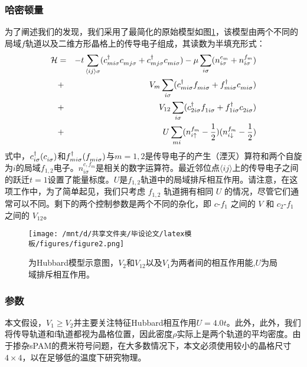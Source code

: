 \subsubsection{哈密顿量}
为了阐述我们的发现，我们采用了最简化的原始模型如图\ref{fig4.1.1}，该模型由两个不同的局域$f$轨道以及二维方形晶格上的传导电子组成，其读数为半填充形式：
\begin{eqnarray}
    {\cal H} &=& - t \sum\limits_{\langle ij \rangle \sigma}
(c^{\dagger}_{mi\sigma}c_{mj\sigma}^{\vphantom{dagger}}
+c^{\dagger}_{mj\sigma}c_{mi\sigma}^{\vphantom{dagger}})
- \mu \sum\limits_{i\sigma} (n^{c_m}_{i\sigma}+ n^{f_m}_{i\sigma} )  \nonumber \\
&+& V_m \sum\limits_{i \sigma}  (c^{\dagger}_{mi\sigma}f_{mi\sigma}^{\vphantom{dagger}}+ f^{\dagger}_{mi\sigma}c_{mi\sigma}^{\vphantom{dagger}}) \nonumber \\
 &+& V_{12} \sum\limits_{i \sigma}  (c^{\dagger}_{2i\sigma}f_{1i\sigma}^{\vphantom{dagger}}+ f^{\dagger}_{1i\sigma}c_{2i\sigma}^{\vphantom{dagger}}) \nonumber \\
    &+& U \sum\limits_{mi} (n^{f_m}_{i\uparrow}-\frac{1}{2}) (n^{f_m}_{i\downarrow}-\frac{1}{2})
\nonumber
\end{eqnarray}
式中，$c^{\dagger}_{i\sigma}(c_{i\sigma}^{\vphantom{dagger}})$和$f^{\dagger}_{mi\sigma}(f_{mi\sigma}^{\vphantom{dagger}})$与$m=1,2$是传导电子的产生（湮灭）算符和两个自旋为$i$的局域$f_{1,2}$电子。$n^{c,f_m}_{i\sigma}$是相关的数字运算符。最近邻位点$\langle ij \rangle$上的传导电子之间的跃迁$t=1$设置了能量标度。$U$是$f_{1,2}$轨道中的局域排斥相互作用。请注意，在这项工作中，为了简单起见，我们只考虑 $f_{1,2}$ 轨道拥有相同 $U$ 的情况，尽管它们通常可以不同。剩下的两个控制参数是两个不同的杂化，即 $c$-$f_1$ 之间的 $V$ 和 $c_2$-$f_1$ 之间的 $V_{12}$。
\begin{figure}[h]
    \centering
    \texttt{[image: /mnt/d/共享文件夹/毕设论文/latex模板/figures/figure2.png]}
    \caption{为Hubbard模型示意图，$V_2$和$V_{12}$以及$V_1$为两者间的相互作用能,$U$为局域排斥相互作用。}
    \label{fig4.1.1}
\end{figure}

\subsubsection{参数}
本文假设，$V_1 \geqslant V_2$并主要关注特征Hubbard相互作用$U=4.0t$。此外，此外，我们将传导轨道和f轨道都视为晶格位置，因此密度$\rho$实际上是两个轨道的平均密度。由于掺杂sPAM的费米符号问题，在大多数情况下，本文必须使用较小的晶格尺寸$4 \times 4$，以在足够低的温度下研究物理。
